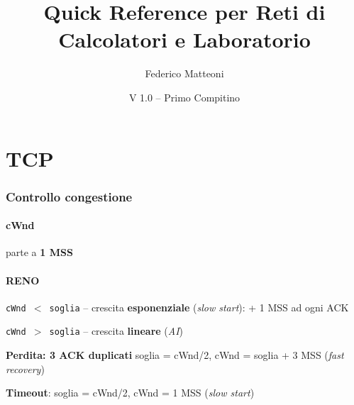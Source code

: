 \documentclass[10pt]{article}
\begin{document}
\title{Quick Reference per Reti di Calcolatori e Laboratorio}
\author{Federico Matteoni}
\date{V 1.0 -- Primo Compitino}
\renewcommand*\contentsname{Indice}

\maketitle

\section{TCP}
\subsubsection{Controllo congestione}
\paragraph{cWnd} parte a \textbf{1 MSS}
\paragraph{RENO} \begin{list}{-}{}
\item \texttt{cWnd $<$ soglia} -- crescita \textbf{esponenziale} (\textit{slow start}): + 1 MSS ad ogni ACK
\item \texttt{cWnd $>$ soglia} -- crescita \textbf{lineare} (\textit{AI})
\item \textbf{Perdita: 3 ACK duplicati} soglia = cWnd/2, cWnd = soglia + 3 MSS (\textit{fast recovery})
\item \textbf{Timeout}: soglia = cWnd/2, cWnd = 1 MSS (\textit{slow start})
\end{list}
\end{document}
